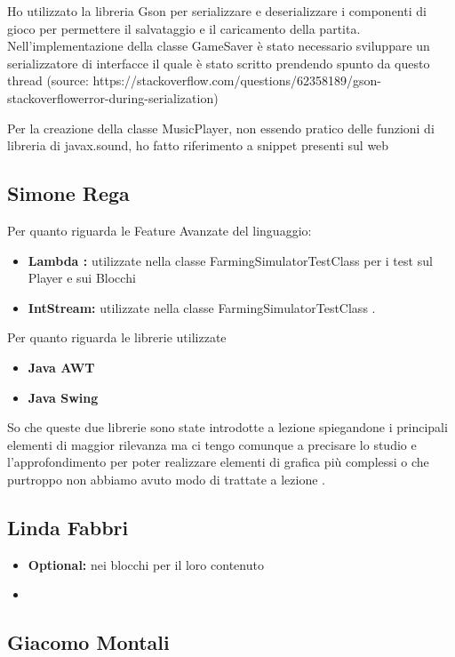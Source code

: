 \documentclass[a4paper,12pt]{report}
\begin{document}
Ho utilizzato la libreria Gson per serializzare e deserializzare i componenti di gioco per permettere il salvataggio e il caricamento della partita.
Nell’implementazione della classe GameSaver è stato necessario sviluppare un serializzatore di interfacce il quale è stato scritto prendendo spunto da questo thread (source: https://stackoverflow.com/questions/62358189/gson-stackoverflowerror-during-serialization)

Per la creazione della classe MusicPlayer, non essendo pratico delle funzioni di libreria di javax.sound, ho fatto riferimento a snippet presenti sul web


\subsection{Simone Rega}
Per quanto riguarda le Feature Avanzate del linguaggio: 
\begin{itemize}
	\item \textbf{Lambda :} utilizzate nella classe FarmingSimulatorTestClass per i test sul Player e sui Blocchi	
	\item \textbf{IntStream: }utilizzate nella classe FarmingSimulatorTestClass .
\end{itemize}

\hfill\break
Per quanto riguarda le librerie utilizzate
\begin{itemize}
	\item \textbf{Java AWT }
	\item \textbf{Java Swing}
\end{itemize}
So che queste due librerie sono state introdotte a lezione spiegandone i principali elementi di maggior rilevanza ma ci tengo comunque a precisare lo studio e l'approfondimento per poter realizzare elementi di grafica più complessi o che purtroppo non abbiamo avuto modo di trattate a lezione .
 
\subsection{Linda Fabbri}

\begin{itemize}
	\item \textbf{Optional: } nei blocchi per il loro contenuto
	\item \
\end{itemize}


\subsection{Giacomo Montali}
\end{document}

